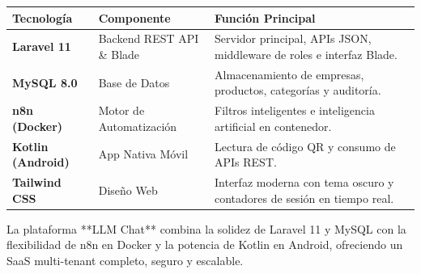 \documentclass[12pt]{article}
\begin{document}
\begin{longtable}{p{3.5cm}p{4.5cm}p{7.5cm}}
\toprule
\textbf{Tecnología} & \textbf{Componente} & \textbf{Función Principal} \\
\midrule
\endhead
\textbf{Laravel 11} & Backend REST API \& Blade & Servidor principal, APIs JSON, middleware de roles e interfaz Blade. \\
\textbf{MySQL 8.0} & Base de Datos & Almacenamiento de empresas, productos, categorías y auditoría. \\
\textbf{n8n (Docker)} & Motor de Automatización & Filtros inteligentes e inteligencia artificial en contenedor. \\
\textbf{Kotlin (Android)} & App Nativa Móvil & Lectura de código QR y consumo de APIs REST. \\
\textbf{Tailwind CSS} & Diseño Web & Interfaz moderna con tema oscuro y contadores de sesión en tiempo real. \\
\bottomrule
\end{longtable}

\begin{resumenbox}[Conclusión]
La plataforma **LLM Chat** combina la solidez de Laravel 11 y MySQL con la flexibilidad de n8n en Docker y la potencia de Kotlin en Android, ofreciendo un SaaS multi-tenant completo, seguro y escalable.
\end{resumenbox}
\end{document}

